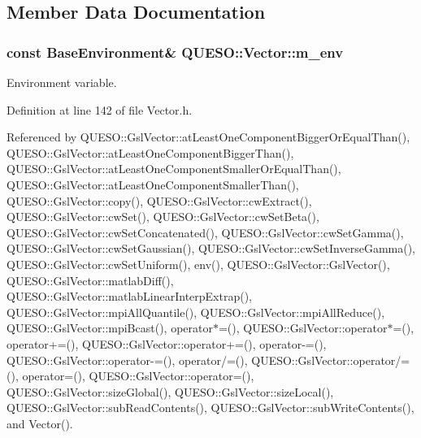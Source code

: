 \subsection{Member Data Documentation}
\hypertarget{class_q_u_e_s_o_1_1_vector_ae7615172bb1e54339151d3f3d71a0344}{
\subsubsection[{m\-\_\-env}]{\setlength{\rightskip}{0pt plus 5cm}const {\bf Base\-Environment}\& Q\-U\-E\-S\-O\-::\-Vector\-::m\-\_\-env\hspace{0.3cm}{\ttfamily [protected]}}}\label{class_q_u_e_s_o_1_1_vector_ae7615172bb1e54339151d3f3d71a0344}


Environment variable. 



Definition at line 142 of file Vector.\-h.



Referenced by Q\-U\-E\-S\-O\-::\-Gsl\-Vector\-::at\-Least\-One\-Component\-Bigger\-Or\-Equal\-Than(), Q\-U\-E\-S\-O\-::\-Gsl\-Vector\-::at\-Least\-One\-Component\-Bigger\-Than(), Q\-U\-E\-S\-O\-::\-Gsl\-Vector\-::at\-Least\-One\-Component\-Smaller\-Or\-Equal\-Than(), Q\-U\-E\-S\-O\-::\-Gsl\-Vector\-::at\-Least\-One\-Component\-Smaller\-Than(), Q\-U\-E\-S\-O\-::\-Gsl\-Vector\-::copy(), Q\-U\-E\-S\-O\-::\-Gsl\-Vector\-::cw\-Extract(), Q\-U\-E\-S\-O\-::\-Gsl\-Vector\-::cw\-Set(), Q\-U\-E\-S\-O\-::\-Gsl\-Vector\-::cw\-Set\-Beta(), Q\-U\-E\-S\-O\-::\-Gsl\-Vector\-::cw\-Set\-Concatenated(), Q\-U\-E\-S\-O\-::\-Gsl\-Vector\-::cw\-Set\-Gamma(), Q\-U\-E\-S\-O\-::\-Gsl\-Vector\-::cw\-Set\-Gaussian(), Q\-U\-E\-S\-O\-::\-Gsl\-Vector\-::cw\-Set\-Inverse\-Gamma(), Q\-U\-E\-S\-O\-::\-Gsl\-Vector\-::cw\-Set\-Uniform(), env(), Q\-U\-E\-S\-O\-::\-Gsl\-Vector\-::\-Gsl\-Vector(), Q\-U\-E\-S\-O\-::\-Gsl\-Vector\-::matlab\-Diff(), Q\-U\-E\-S\-O\-::\-Gsl\-Vector\-::matlab\-Linear\-Interp\-Extrap(), Q\-U\-E\-S\-O\-::\-Gsl\-Vector\-::mpi\-All\-Quantile(), Q\-U\-E\-S\-O\-::\-Gsl\-Vector\-::mpi\-All\-Reduce(), Q\-U\-E\-S\-O\-::\-Gsl\-Vector\-::mpi\-Bcast(), operator$\ast$=(), Q\-U\-E\-S\-O\-::\-Gsl\-Vector\-::operator$\ast$=(), operator+=(), Q\-U\-E\-S\-O\-::\-Gsl\-Vector\-::operator+=(), operator-\/=(), Q\-U\-E\-S\-O\-::\-Gsl\-Vector\-::operator-\/=(), operator/=(), Q\-U\-E\-S\-O\-::\-Gsl\-Vector\-::operator/=(), operator=(), Q\-U\-E\-S\-O\-::\-Gsl\-Vector\-::operator=(), Q\-U\-E\-S\-O\-::\-Gsl\-Vector\-::size\-Global(), Q\-U\-E\-S\-O\-::\-Gsl\-Vector\-::size\-Local(), Q\-U\-E\-S\-O\-::\-Gsl\-Vector\-::sub\-Read\-Contents(), Q\-U\-E\-S\-O\-::\-Gsl\-Vector\-::sub\-Write\-Contents(), and Vector().

